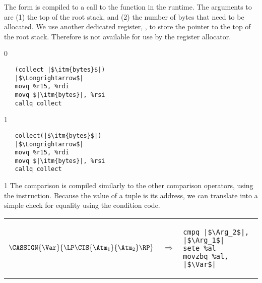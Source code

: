 \documentclass[7x10]{TimesAPriori_MIT}%
\def\racketEd{0}
\def\pythonEd{1}
\def\edition{1}
\newcommand{\pythonColor}[0]{}
\numberwithin{theorem}{chapter}
\numberwithin{definition}{chapter}
\numberwithin{equation}{chapter}
\begin{document}
%
The  form is compiled to a call to the 
function in the runtime. The arguments to  are (1) the
top of the root stack, and (2) the number of bytes that need to be
allocated.  We use another dedicated register, , to store
the pointer to the top of the root stack. Therefore  is not
available for use by the register allocator.
%
{\if\edition\racketEd
\begin{lstlisting}
   (collect |$\itm{bytes}$|)
   |$\Longrightarrow$|
   movq %r15, %rdi
   movq $|\itm{bytes}|, %rsi
   callq collect
\end{lstlisting}
\fi}
{\if\edition\pythonEd\pythonColor    
\begin{lstlisting}
   collect(|$\itm{bytes}$|)
   |$\Longrightarrow$|
   movq %r15, %rdi
   movq $|\itm{bytes}|, %rsi
   callq collect
\end{lstlisting}
\fi}

{\if\edition\pythonEd\pythonColor    
The  comparison is compiled similarly to the other comparison
operators, using the  instruction. Because the value of a
tuple is its address, we can translate  into a simple check
for equality using the  condition code. \\
\begin{tabular}{lll}
\begin{minipage}{0.4\textwidth}
$\CASSIGN{\Var}{ \LP\CIS{\Atm_1}{\Atm_2} \RP }$ 
\end{minipage}
&
$\Rightarrow$
&
\begin{minipage}{0.4\textwidth}
\begin{lstlisting}
cmpq |$\Arg_2$|, |$\Arg_1$|
sete %al
movzbq %al, |$\Var$|
\end{lstlisting}
\end{minipage}
\end{tabular}
\fi}


\newcommand{\GrammarXGlobal}{
\begin{array}{lcl}
  \Arg &::=& \itm{label} \key{(\%rip)} 
\end{array}
}

\newcommand{\ASTXGlobalRacket}{
\begin{array}{lcl}
  \Arg &::=&  \GLOBAL{\itm{label}} 
\end{array}
}
\end{document}
